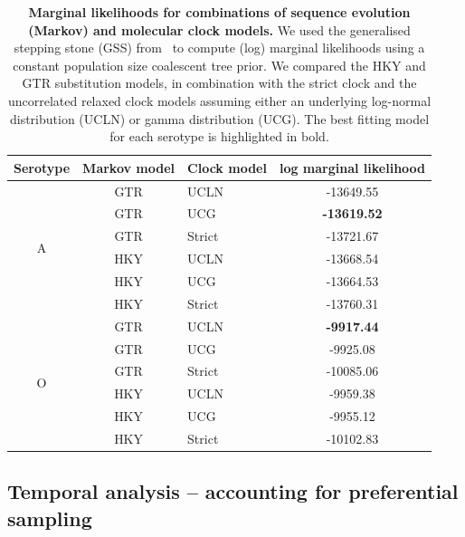\documentclass[a4paper,10pt]{article}
\begin{document}
\begin{table}[!ht]
\caption{\textbf{Marginal likelihoods for combinations of sequence evolution (Markov) and molecular clock models.}
We used the generalised stepping stone (GSS) from~\citep{M-Baele2016} to compute (log) marginal likelihoods using a constant population size coalescent tree prior.
We compared the HKY and GTR substitution models, in combination with the strict clock and the uncorrelated relaxed clock models assuming either an underlying log-normal distribution (UCLN) or gamma distribution (UCG).
The best fitting model for each serotype is highlighted in bold.
}
\begin{center}
 \begin{tabular}{cclc}
\hline
Serotype & Markov model & Clock model & log marginal likelihood \\
\hline
\multirow{6}{*}{A} & GTR & UCLN & -13649.55 \\
 & GTR & UCG & \textbf{-13619.52} \\
 & GTR & Strict & -13721.67 \\
 & HKY & UCLN & -13668.54 \\
 & HKY & UCG & -13664.53 \\
 & HKY & Strict & -13760.31 \\
 \hline
\multirow{6}{*}{O}& GTR & \multicolumn{1}{l}{UCLN} & \textbf{-9917.44} \\
\multicolumn{1}{l}{} & GTR & \multicolumn{1}{l}{UCG} & -9925.08 \\
\multicolumn{1}{l}{} & GTR & \multicolumn{1}{l}{Strict} & -10085.06 \\
\multicolumn{1}{l}{} & HKY & \multicolumn{1}{l}{UCLN} & -9959.38 \\
\multicolumn{1}{l}{} & HKY & \multicolumn{1}{l}{UCG} & -9955.12 \\
\multicolumn{1}{l}{} & HKY & \multicolumn{1}{l}{Strict} & -10102.83\\
\hline
\end{tabular}
\end{center}
\label{stab:treeclockselection}
\end{table}
\newpage

\subsection*{Temporal analysis -- accounting for preferential sampling}
\end{document}
